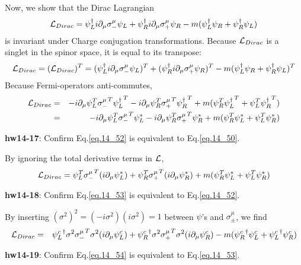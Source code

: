 \documentclass[12pt]{article}
\def\del{{\partial}}
\begin{document}
  Now, we show that the Dirac Lagrangian
\begin{eqnarray}
  {\cal L}_{Dirac} = \psi_L^\dagger i\del_\mu \sigma_-^\mu \psi_L
                + \psi_R^\dagger i\del_\mu \sigma_+^\mu \psi_R
                - m (\psi_L^\dagger \psi_R + \psi_R^\dagger \psi_L) \label{eq.14_50}
\end{eqnarray}
  is invariant under Charge conjugation transformations. Because ${\cal L}_{Dirac}$ is a singlet in the spinor space, it is equal to its transpose:
\begin{eqnarray}
  {\cal L}_{Dirac}= (  {\cal L}_{Dirac} )^T
  = ( \psi_L^\dagger i\del_\mu \sigma_-^\mu \psi_L )^T
  + ( \psi_R^\dagger i\del_\mu \sigma_+^\mu \psi_R )^T
  - m ( \psi_L^\dagger \psi_R + \psi_R^\dagger \psi_L )^T\label{eq.14_51}
\end{eqnarray}
  Because Fermi-operators anti-commutes,
\begin{eqnarray}
  {\cal L}_{Dirac} &=& - i\del_\mu \psi_L^T{\sigma_-^\mu}^T {\psi_L^\dagger}^T - i\del_\mu \psi_R^T{\sigma_+^\mu}^T {\psi_R^\dagger}^T
  + m( \psi_R^T {\psi_L^\dagger}^T + \psi_L^T {\psi_R^\dagger}^T )\\
&=& - i\del_\mu \psi_L^T{\sigma_-^\mu}^T \psi_L^*
  - i\del_\mu \psi_R^T {\sigma_+^\mu}^T \psi_R^*
  + m( \psi_R^T \psi_L^* + \psi_L^T \psi_R^* ) \label{eq.14_52}
\end{eqnarray}

{\bf hw14-17}: Confirm Eq.\ref{eq.14_52} is equivalent to Eq.\ref{eq.14_50}.

  By ignoring the total derivative terms in ${\cal L}$,
\begin{eqnarray}
  {\cal L}_{Dirac}=\psi_L^T{\sigma_-^\mu}^T( i\del_\mu \psi_L^*)+\psi_R^T {\sigma_+^\mu}^T(i\del_\mu \psi_R^*) + m( \psi_R^T \psi_L^* + \psi_L^T \psi_R^* ) \label{eq.14_53}
\end{eqnarray}

{\bf hw14-18}: Confirm Eq.\ref{eq.14_53} is equivalent to Eq.\ref{eq.14_52}.

  By inserting $(\sigma^2)^2 = (-i\sigma^2)(i\sigma^2) = 1$ between $\psi$'s
  and $\sigma_\pm^\mu$, we find
\begin{eqnarray}
  {\cal L}_{Dirac} &=& {\psi_L^c}^\dagger \sigma^2 {\sigma_-^\mu}^T \sigma^2 ( i\del_\mu {\psi_L^c})+{\psi_R^c}^\dagger \sigma^2 {\sigma_+^\mu}^T \sigma^2(i\del_\mu {\psi_R^c}) - m( {\psi_R^c}^\dagger{\psi_L^c} + {\psi_L^c}^\dagger {\psi_R^c})  \label{eq.14_54}
\end{eqnarray}

{\bf hw14-19}: Confirm Eq.\ref{eq.14_54} is equivalent to Eq.\ref{eq.14_53}.
\end{document}
